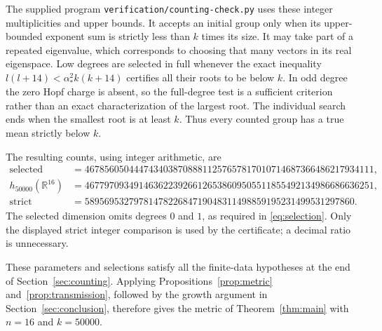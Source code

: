 The supplied program \texttt{verification/counting-check.py}
uses these integer multiplicities and upper bounds.  It accepts an initial
group only when its upper-bounded exponent sum is strictly less than
\(k\) times its size.  It may take part of a repeated eigenvalue, which
corresponds to choosing that many vectors in its real eigenspace.  Low
degrees are selected in full whenever the exact inequality
\(l(l+14)<\alpha_*^2k(k+14)\) certifies all their roots to be below \(k\).
In odd degree the zero Hopf charge is absent, so the full-degree test
is a sufficient criterion rather than an exact characterization of the
largest root. The individual search ends when the smallest root is at least \(k\).
Thus every counted group has a true mean strictly below \(k\).

The resulting counts, using integer arithmetic, are
\begin{align*}
 \text{selected dimension}
   &=46785605044474340387088811257657817010714687366486217934111,\\
 h_{50000}(\mathbb R^{16})
   &=46779709349146362239266126538609505511855492134986686636251,\\
 \text{strict surplus}
   &=5895695327978147822684719048311498859195231499531297860.
\end{align*}
The selected dimension omits degrees \(0\) and \(1\), as required in
\eqref{eq:selection}.  Only the displayed strict integer comparison is
used by the certificate; a decimal ratio is unnecessary.

These parameters and selections satisfy all the finite-data hypotheses at
the end of Section~\ref{sec:counting}. Applying
Propositions~\ref{prop:metric} and~\ref{prop:transmission}, followed by the
growth argument in Section~\ref{sec:conclusion}, therefore gives the metric
of Theorem~\ref{thm:main} with \(n=16\) and \(k=50000\).

